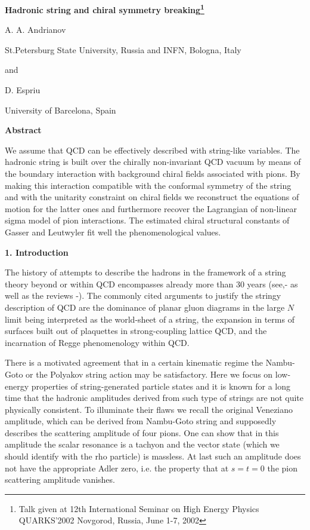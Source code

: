 \documentclass[a4paper,12pt]{article}
\begin{document}
\renewcommand{\thefootnote}{\fnsymbol{footnote}} 
\centerline{\Large\bf Hadronic string and chiral symmetry 
breaking\footnote{Talk given at
12th International Seminar on High Energy Physics QUARKS'2002
                        Novgorod, Russia, June 1-7, 2002}}

\bigskip

\centerline{
\large A. A. Andrianov}
\centerline{St.Petersburg State University, Russia and INFN, Bologna, 
Italy}
\centerline{and}
\centerline{\large D. Espriu}
\centerline{University of Barcelona, Spain}

\bigskip

\centerline{\bf Abstract}
{\small
We assume that QCD can be effectively described
with string-like variables.
The hadronic string is built over the 
chirally non-invariant QCD vacuum by means of the boundary interaction
with background chiral fields associated with pions. By making this interaction
compatible with the conformal symmetry of the string and 
with the unitarity constraint 
on chiral fields we reconstruct the equations of motion for the latter ones 
and furthermore recover the Lagrangian of non-linear sigma model of pion 
interactions. The estimated chiral structural constants of 
Gasser and Leutwyler 
fit well the phenomenological values.}\\

\centerline{\large\bf 1. Introduction}

\medskip

The history of attempts to describe the hadrons in the framework of
a string theory beyond or within QCD encompasses already  
more than 30 years (see,\cite{Ven}-\cite{solo} as well as 
the reviews \cite{Rebbi}-\cite{pol}). 
The commonly cited arguments to justify the stringy description of QCD
 are the dominance of planar gluon diagrams
in the large $N$ limit\cite{largeN} 
being interpreted as the world-sheet of a string,
the expansion in terms of surfaces built out of plaquettes
in strong-coupling lattice QCD\cite{lattice}, and 
the incarnation of
Regge phenomenology\cite{regge} within QCD\cite{Lip}.

There is a motivated 
agreement that in a certain
kinematic regime the  Nambu-Goto or the Polyakov
string action may be satisfactory. Here we focus on 
low-energy properties of string-generated particle states 
and it is known for a long
time that the hadronic amplitudes derived from such type of strings
are not quite physically consistent.  
To illuminate their flaws we recall
the original Veneziano amplitude\cite{Ven}, which can be derived from
Nambu-Goto string and supposedly describes the 
scattering amplitude of four
pions. One can show that in this amplitude the scalar resonance is  
a tachyon and the vector state (which we should
identify with the rho particle) is massless. 
At last such an amplitude does not have the appropriate Adler
zero, i.e. the property that at $s=t=0$ the pion scattering amplitude 
vanishes.
\end{document}
